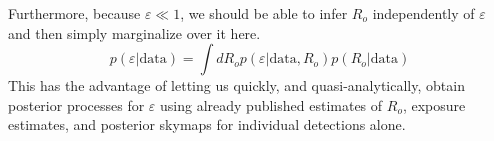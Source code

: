 \documentclass{article}
\begin{document}
Furthermore, because $\varepsilon\ll1$, we should be able to infer $R_o$ independently of $\varepsilon$ and then simply marginalize over it here.
\begin{equation}
    p(\varepsilon|\mathrm{data}) = \int dR_o p(\varepsilon|\mathrm{data},R_o)p(R_o|\mathrm{data})
\end{equation}
This has the advantage of letting us quickly, and quasi-analytically, obtain posterior processes for $\varepsilon$ using already published estimates of $R_o$, exposure estimates, and posterior skymaps for individual detections alone.

\end{document}
